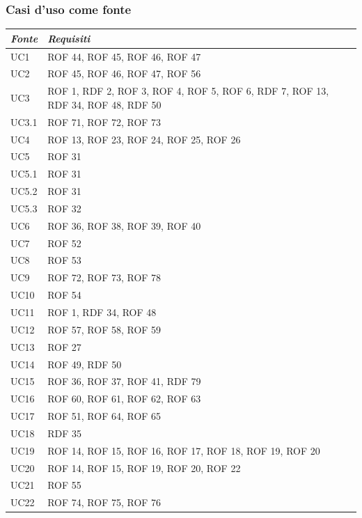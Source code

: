 \documentclass[12pt, oneside]{article}
\begin{document}
\subsubsection{Casi d'uso come fonte}
\begin{longtable}{|p{4cm}|p{12cm}|}
    \hline
    \emph{Fonte} & \emph{Requisiti}\\
    \hline
    \endfirsthead
    \endhead
    UC1 & ROF 44, ROF 45, ROF 46, ROF 47 \\
    \hline
    UC2 & ROF 45, ROF 46, ROF 47, ROF 56  \\
    \hline
    UC3 & ROF 1, RDF 2, ROF 3, ROF 4, ROF 5, ROF 6, RDF 7, ROF 13, RDF 34, ROF 48, RDF 50 \\
    \hline 
    UC3.1 & ROF 71, ROF 72, ROF 73 \\
    \hline
    UC4 & ROF 13, ROF 23, ROF 24, ROF 25, ROF 26 \\
    \hline
    UC5 & ROF 31 \\
    \hline
    UC5.1 & ROF 31 \\
    \hline
    UC5.2 & ROF 31 \\
    \hline
    UC5.3 & ROF 32 \\
    \hline
    UC6 & ROF 36, ROF 38, ROF 39, ROF 40 \\
    \hline
    UC7 & ROF 52  \\
    \hline
    UC8 & ROF 53 \\
    \hline
    UC9 & ROF 72, ROF 73, ROF 78 \\
    \hline
    UC10 & ROF 54 \\
    \hline
    UC11 & ROF 1, RDF 34, ROF 48 \\
    \hline
    UC12 & ROF 57, ROF 58, ROF 59 \\
    \hline
    UC13 & ROF 27 \\
    \hline
    UC14 & ROF 49, RDF 50 \\
    \hline
    UC15 & ROF 36, ROF 37, ROF 41, RDF 79 \\
    \hline
    UC16 & ROF 60, ROF 61, ROF 62, ROF 63 \\
    \hline
    UC17 & ROF 51, ROF 64, ROF 65 \\
    \hline
    UC18 & RDF 35 \\
    \hline
    UC19 & ROF 14, ROF 15, ROF 16, ROF 17, ROF 18, ROF 19, ROF 20 \\
    \hline
    UC20 & ROF 14, ROF 15, ROF 19, ROF 20, ROF 22\\
    \hline
    UC21 & ROF 55 \\
    \hline
    UC22 & ROF 74, ROF 75, ROF 76 \\

\end{longtable}
\end{document}
